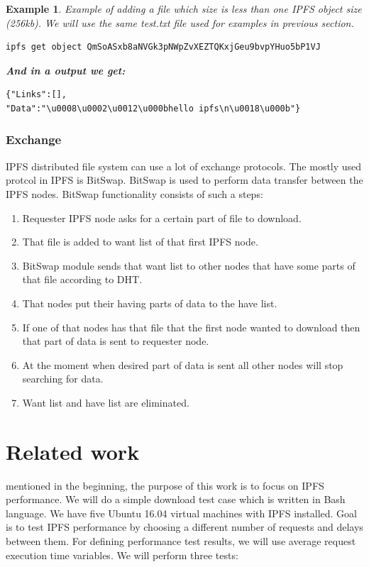 \documentclass[a4paper,12pt,fleqn]{article}
\newtheorem{exmp}{Example}[subsection]
\begin{document}
\begin{exmp} Example of adding a file which size is less than one IPFS object size (256kb). We will use the same test.txt file used for examples in previous section.
\begin{lstlisting}[caption={Requesting IPFS objects of file < 256kb.},label={abc}]
ipfs get object QmSoASxb8aNVGk3pNWpZvXEZTQKxjGeu9bvpYHuo5bP1VJ
\end{lstlisting}
\textbf{And in a output we get:}
\begin{lstlisting}[caption={Created IPFS objects of file < 256kb.},label={abc}]
{"Links":[],
"Data":"\u0008\u0002\u0012\u000bhello ipfs\n\u0018\u000b"}
\end{lstlisting}
\end{exmp}

\subsubsection{Exchange}
IPFS distributed file system can use a lot of exchange protocols. The mostly used protcol in IPFS is BitSwap. BitSwap is used to perform data transfer between the IPFS nodes. BitSwap functionality consists of such a steps:
\begin{enumerate}
    \item 	Requester IPFS node asks for a certain part of file to download.
    \item 	That file is added to want list of that first IPFS node.
    \item 	BitSwap module sends that want list to other nodes that have some parts of that file according to DHT.
    \item 	That nodes put their having parts of data to the have list.
    \item 	If one of that nodes has that file that the first node wanted to download then that part of data is sent to requester node.
    \item 	At the moment when desired part of data is sent all other nodes will stop searching for data.
    \item 	Want list and have list are eliminated.
\end{enumerate}

\section{Related work}

 mentioned in the beginning, the purpose of this work is to focus on IPFS performance. We will do a simple download test case which is written in Bash language. We have five Ubuntu 16.04 virtual machines with IPFS installed. Goal is to test IPFS performance by choosing a different number of requests and delays between them. For defining performance test results, we will use average request execution time variables. We will perform three tests:
\end{document}

